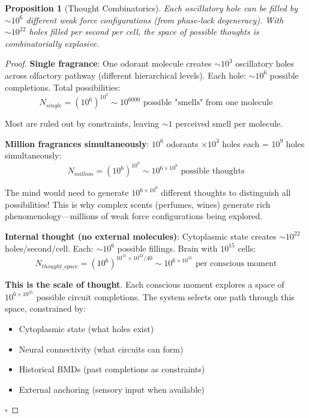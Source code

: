 \documentclass[11pt,a4paper]{article}
\newtheorem{proposition}[theorem]{Proposition}
\begin{document}
\begin{proposition}[Thought Combinatorics]
Each oscillatory hole can be filled by $\sim 10^6$ different weak force configurations (from phase-lock degeneracy). With $\sim 10^{22}$ holes filled per second per cell, the space of possible thoughts is combinatorially explosive.
\end{proposition}

\begin{proof}
\textbf{Single fragrance}: One odorant molecule creates $\sim 10^3$ oscillatory holes across olfactory pathway (different hierarchical levels). Each hole: $\sim 10^6$ possible completions. Total possibilities:
\begin{equation}
N_{single} = (10^6)^{10^3} \sim 10^{6000} \text{ possible "smells" from one molecule}
\end{equation}

Most are ruled out by constraints, leaving $\sim 1$ perceived smell per molecule.

\textbf{Million fragrances simultaneously}: $10^6$ odorants $\times 10^3$ holes each = $10^9$ holes simultaneously:
\begin{equation}
N_{million} = (10^6)^{10^9} \sim 10^{6 \times 10^9} \text{ possible thoughts}
\end{equation}

The mind would need to generate $10^{6 \times 10^9}$ different thoughts to distinguish all possibilities! This is why complex scents (perfumes, wines) generate rich phenomenology—millions of weak force configurations being explored.

\textbf{Internal thought (no external molecules)}: Cytoplasmic state creates $\sim 10^{22}$ holes/second/cell. Each: $\sim 10^6$ possible fillings. Brain with $10^{15}$ cells:
\begin{equation}
N_{thought\_space} = (10^6)^{10^{15} \times 10^{22}/40} \sim 10^{6 \times 10^{35}} \text{ per conscious moment}
\end{equation}

\textbf{This is the scale of thought}. Each conscious moment explores a space of $10^{6 \times 10^{35}}$ possible circuit completions. The system selects one path through this space, constrained by:
\begin{itemize}
\item Cytoplasmic state (what holes exist)
\item Neural connectivity (what circuits can form)
\item Historical BMDs (past completions as constraints)
\item External anchoring (sensory input when available)
\end{itemize}

$\square$
\end{proof}
\end{document}
